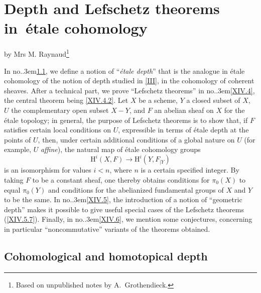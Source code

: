\documentclass[11pt,a4paper,oneside]{book}
\providecommand{\sisi}[2]{#2}
\providecommand{\pageoriginale}{%
  \refstepcounter{pageoriginal}%
  \marginpar{\raggedright\footnotesize\bfseries\thepageoriginal}%
  \xspace}
\providecommand{\chapterspace}[1]{}
\providecommand{\sfootnote}[1]{\footnote{#1}}
\providecommand{\og}{``}
\providecommand{\fg}{''\xspace}
\providecommand{\numero}{no.\kern.3em}
\renewcommand{\H}{\mathrm H}
\theoremstyle{plain}
\theoremstyle{definition}
\theoremstyle{remark}
\renewcommand{\Ref}[1]{\textup{\ref{#1}}}
\begin{document}
\chapterspace{-4}


\chapter[Depth and Lefschetz theorems]
{Depth and Lefschetz theorems in~\'{e}tale cohomology} \label{XIV}
\begin{center}
by Mrs M. Raynaud\sfootnote{Based on unpublished notes by A.~Grothendieck.}
\end{center}

\vspace*{1cm}
In\pageoriginale \numero \Ref{XIV.1}, we define a notion of \og \textit{\'{e}tale depth}\fg that is the analogue in \'{e}tale cohomology of the notion of depth studied in \Ref{III}, in the cohomology of coherent sheaves. After a technical part, we prove \og Lefschetz theorems\fg in \numero \Ref{XIV.4}, the central theorem being \Ref{XIV.4.2}. Let $X$ be a scheme, $Y$ a closed subset of $X$, $U$ the complementary open subset $X-Y$, and $F$ an abelian sheaf on $X$ for the \'{e}tale topology; in general, the purpose of Lefschetz theorems is to show that, if $F$ satisfies certain local conditions on $U$, expressible in terms of \'{e}tale depth at the points of $U$, then, under certain additional conditions of a global nature on $U$ (for example, $U$ \textit{affine}), the natural map of \'{e}tale cohomology groups
$$
\H^i(X, F)\to \H^i(Y, \sisi{F{|Y}}{F_{|Y}})$$
is an isomorphism for values $i<n$, where $n$ is a certain specified integer. By taking $F$ to be a constant sheaf, one thereby obtains conditions for $\pi_0(X)$ to equal $\pi_0(Y)$ and conditions for the abelianized fundamental groups of $X$ and $Y$ to be the same. In \numero \Ref{XIV.5}, the introduction of a notion of \og geometric depth\fg makes it possible to give useful special cases of the Lefschetz theorems (\Ref{XIV.5.7}). Finally, in \numero \Ref{XIV.6}, we mention some conjectures, concerning in particular \og noncommutative\fg variants of the theorems obtained.

\section{Cohomological and homotopical depth}\label{XIV.1}

\setcounter{subsection}{-1}
\end{document}
